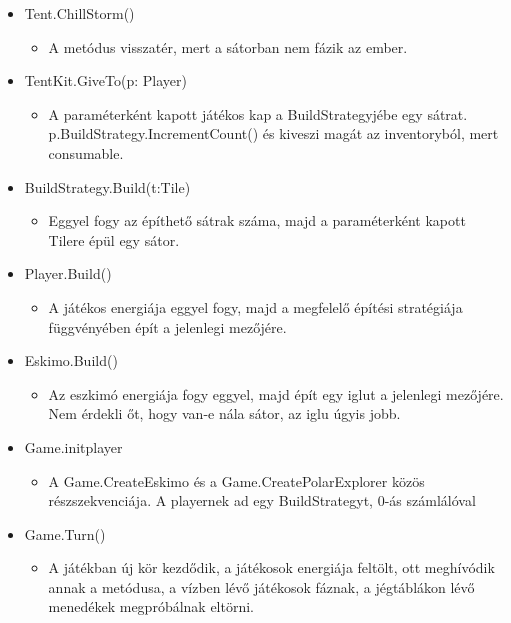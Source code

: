 \begin{itemize}
\item Tent.ChillStorm()
\begin{itemize} \item A metódus visszatér, mert a sátorban nem fázik az ember. \end{itemize}

\item TentKit.GiveTo(p: Player)
\begin{itemize} \item  A paraméterként kapott játékos kap a BuildStrategyjébe egy sátrat. p.BuildStrategy.IncrementCount() és kiveszi magát az inventoryból, mert consumable. \end{itemize}

\item BuildStrategy.Build(t:Tile)
\begin{itemize} \item  Eggyel fogy az építhető sátrak száma, majd a paraméterként kapott Tilere épül egy sátor. \end{itemize}

\item Player.Build()
\begin{itemize} \item A játékos energiája eggyel fogy, majd a megfelelő építési stratégiája függvényében épít a jelenlegi mezőjére. \end{itemize}

\item Eskimo.Build()
\begin{itemize} \item Az eszkimó energiája fogy eggyel, majd épít egy iglut a jelenlegi mezőjére. Nem érdekli őt, hogy van-e nála sátor, az iglu úgyis jobb. \end{itemize}

\item Game.initplayer
\begin{itemize} \item  A Game.CreateEskimo és a Game.CreatePolarExplorer közös részszekvenciája. A playernek ad egy BuildStrategyt, 0-ás számlálóval \end{itemize}

\item Game.Turn()
\begin{itemize} \item  A játékban új kör kezdődik, a játékosok energiája feltölt, ott meghívódik annak a metódusa, a vízben lévő  játékosok fáznak, a jégtáblákon lévő menedékek megpróbálnak eltörni. \end{itemize}


\end{itemize}
